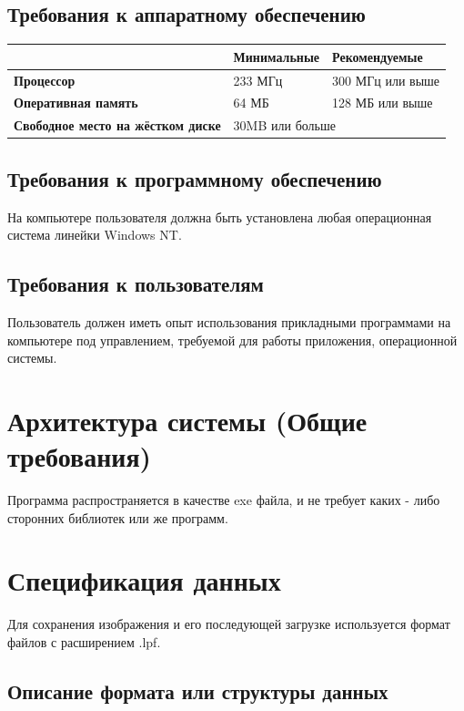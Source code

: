 \documentclass[a4paper,12pt]{article}
\begin{document}
\subsection{Требования к аппаратному обеспечению}

\begin{tabular}{|p{1.3in}|p{1.6in}|p{1.5in}|} \hline 
\textbf{} & \textbf{Минимальные} & \textbf{Рекомендуемые} \\ \hline 
\textbf{Процессор} & 233 МГц & 300 МГц или выше \\ \hline 
\textbf{Оперативная память} & 64 МБ  & 128 МБ или выше \\ \hline 
\textbf{Свободное место на жёстком диске} & \multicolumn{2}{|p{3.1in}|}{30MB или больше} \\ \hline 
\end{tabular}


\subsection{Требования к программному обеспечению}

На компьютере пользователя должна быть установлена любая операционная система линейки Windows NT.


\subsection{Требования к пользователям}

Пользователь должен иметь опыт использования прикладными программами на компьютере под управлением, требуемой для работы приложения, операционной системы.


\section{Архитектура системы (Общие требования)}

Программа распространяется в качестве exe файла, и не требует каких - либо сторонних библиотек или же программ.


\section{Спецификация данных}

Для сохранения изображения и его последующей загрузке используется формат файлов с расширением .lpf.


\subsection{Описание формата или структуры данных}
\end{document}
